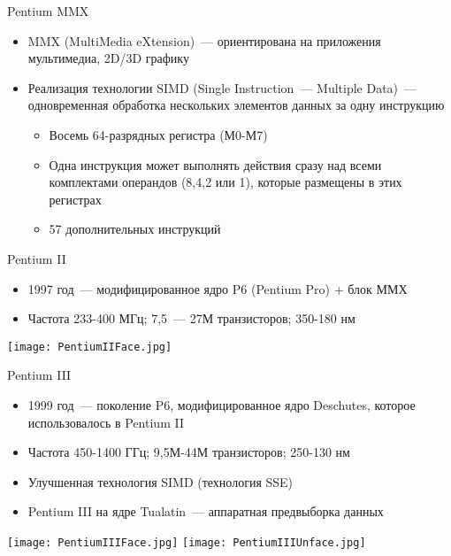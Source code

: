 \documentclass[aspectratio=169,14pt]{beamer}
\begin{document}
\begin{frame}{Pentium MMX}
    \begin{itemize}
        \item MMX (MultiMedia eXtension)~--- ориентирована на
        приложения мультимедиа, 2D/3D графику
        \item Реализация технологии SIMD (Single Instruction~--- Multiple
         Data)~--- одновременная обработка нескольких элементов
         данных за одну инструкцию
        \begin{itemize}
            \item Восемь 64-разрядных регистра (М0-М7)
            \item Одна инструкция может выполнять действия сразу
            над всеми комплектами операндов (8,4,2 или 1), которые
            размещены в этих регистрах
            \item 57 дополнительных инструкций
        \end{itemize}
    \end{itemize}
\end{frame}

\begin{frame}{Pentium II}
    \begin{itemize}
        \item 1997 год~--- модифицированное ядро P6 (Pentium Pro) + блок ММХ
        \item Частота 233-400 МГц; 7,5~--- 27М транзисторов;
        350-180 нм
    \end{itemize}
    \texttt{[image: PentiumIIFace.jpg]}
\end{frame}

\begin{frame}{Pentium III}
    \begin{itemize}
        \item 1999 год~--- поколение P6, модифицированное ядро
        Deschutes, которое использовалось в Pentium II
        \item Частота 450-1400 ГГц;  9,5М-44М транзисторов; 250-130 нм
        \item Улучшенная технология SIMD (технология SSE)
        \item Pentium III на ядре Tualatin~--- аппаратная
        предвыборка данных
    \end{itemize}
    \texttt{[image: PentiumIIIFace.jpg]}
    \texttt{[image: PentiumIIIUnface.jpg]}
\end{frame}
\end{document}
